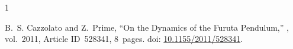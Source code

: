 \documentclass[a4paper,11pt]{scrartcl}
\begin{document}
\begin{answerbox}[3]\end{answerbox}

\begin{answerbox}[6]\end{answerbox}

\begin{answerboxruled}[5]\end{answerboxruled}

\begin{answerboxruled}[8]\end{answerboxruled}

\begin{thebibliography}{1}

    B.~S. Cazzolato and Z.~Prime,
    \newblock ``On the Dynamics of the Furuta Pendulum,''
    , vol.~2011, Article ID~528341, 8~pages.
    \newblock doi: \href{https://doi.org/10.1155/2011/528341}{10.1155/2011/528341}.

\end{thebibliography}
\end{document}

